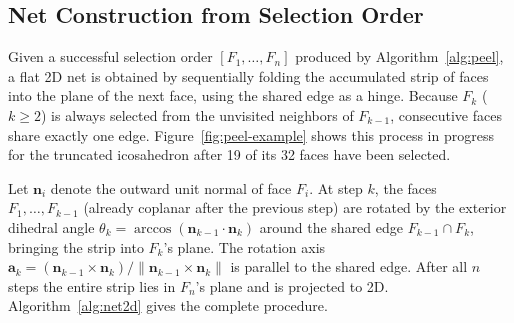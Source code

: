 \documentclass[12pt]{article}
\theoremstyle{definition}
\begin{document}
\subsection{Net Construction from Selection Order}
\label{sec:netconstruct}

Given a successful selection order $[F_1,\ldots,F_n]$ produced by
Algorithm~\ref{alg:peel}, a flat 2D net is obtained by sequentially
folding the accumulated strip of faces into the plane of the next face,
using the shared edge as a hinge.
Because $F_k$ ($k\ge2$) is always selected from the unvisited neighbors
of $F_{k-1}$, consecutive faces share exactly one edge.
Figure~\ref{fig:peel-example} shows this process in progress for the
truncated icosahedron after 19 of its 32 faces have been selected.

Let $\mathbf{n}_i$ denote the outward unit normal of face $F_i$.
At step $k$, the faces $F_1,\ldots,F_{k-1}$ (already coplanar after the
previous step) are rotated by the exterior dihedral angle
$\theta_k = \arccos(\mathbf{n}_{k-1}\cdot\mathbf{n}_k)$ around the shared
edge $F_{k-1}\cap F_k$, bringing the strip into $F_k$'s plane.
The rotation axis $\mathbf{a}_k = (\mathbf{n}_{k-1}\times\mathbf{n}_k)/\|\mathbf{n}_{k-1}\times\mathbf{n}_k\|$
is parallel to the shared edge.
After all $n$ steps the entire strip lies in $F_n$'s plane and is
projected to 2D.
Algorithm~\ref{alg:net2d} gives the complete procedure.
\end{document}
